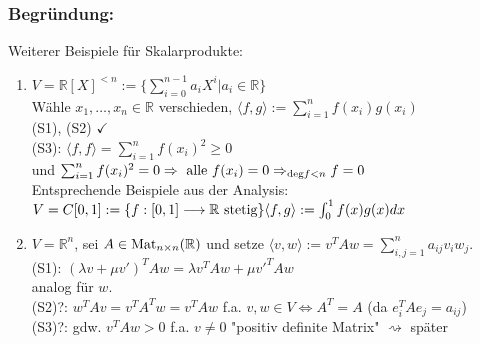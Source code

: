\documentclass[a4paper, 12pt]{extarticle}
\newcommand{\skalar}[2] {
	\langle #1, #2\rangle
}
\newcommand{\genskalar}{
	\skalar{\cdot }{\cdot }
}
\newcommand{\tn}[1]{\textnormal {#1}}
\begin{document}
\subsubsection*{Begründung:}
\begin{figure}[h]
\end{figure}

Weiterer Beispiele für Skalarprodukte:
\begin{enumerate}[label=\arabic*)]
	\item $V = \mathbb{R}[X]^{< n} := \{\sum_{i=0}^{n-1}a_iX^i | a_i \in \mathbb{R}\}$\\
	Wähle $x_1, \dots, x_n \in \mathbb{R}$ verschieden, ${\skalar{f}{g}} := \sum_{i=1}^{n}f(x_i)g(x_i)$\\
	(S1), (S2) $\checkmark$\\
	(S3): ${\skalar{f}{f}} = \sum_{i=1}^{n}f(x_i)^2 \geq 0$\\
	und $\sum_{i=1}^{n}f(x_i)^2 = 0 \Rightarrow \tn{ alle } f(x_i) = 0 \Rightarrow_{\tn{deg}f<n} f = 0$\\
	Entsprechende Beispiele aus der Analysis:\\
	$V = C[0,1] := \{f:[0,1] \longrightarrow \mathbb{R} \tn{ stetig}\}\\
	{\skalar{f}{g}} := \int_{0}^{1}f(x)g(x)dx$
	\item $V = \mathbb{R}^n$, sei $A \in \tn{Mat}_{n\times n}(\mathbb{R})$ und setze ${\skalar{v}{w}} := v^TAw = \sum_{i, j=1}^{n}a_{ij}v_iw_j$.\\
	(S1): $(\lambda v+\mu v')^TAw = \lambda v^TAw+\mu v'^TAw$\\
	analog für $w$.\\
	(S2)?: $w^TAv = v^TA^Tw = v^TAw$ f.a. $v, w \in V \Leftrightarrow A^T = A$ (da $e_i^TAe_j=a_{ij}$)\\
	(S3)?: gdw. $v^TAw > 0$ f.a. $v \neq 0$ "positiv definite Matrix" $\rightsquigarrow$ später
\end{enumerate}
\end{document}
